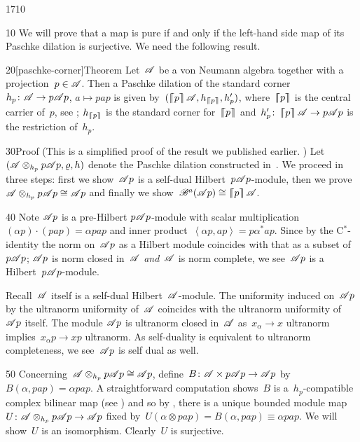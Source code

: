 \begin{parsec}{1710}%
\begin{point}{10}%
We will prove that a map is pure if and only if
    the left-hand side map of its Paschke dilation
    is surjective.  We need the following result.
\end{point}
\begin{point}{20}[paschke-corner]{Theorem}%
Let~$\mathscr{A}$ be a von Neumann algebra together with a projection~$p \in \mathscr{A}$.
Then a Paschke dilation of the standard corner~$h_p \colon \mathscr{A} \to p\mathscr{A} p$,
$a \mapsto pap$
is given by~$(\cceil{p}\scrA, h_{\cceil{p}}, h'_p)$,
    where~$\left\lceil\!\!\left\lceil p\right\rceil\!\!\right\rceil$ is the central  carrier of~$p$,
    see ;
    $h_{\left\lceil\!\!\left\lceil p\right\rceil\!\!\right\rceil}$ is the standard corner for~$\left\lceil\!\!\left\lceil p\right\rceil\!\!\right\rceil$
        and~$h'_p \colon \left\lceil\!\!\left\lceil p\right\rceil\!\!\right\rceil \mathscr{A} \to p\mathscr{A} p$
        is the restriction of~$h_p$.
\begin{point}{30}{Proof}%
(This is a simplified proof of the result we published earlier.
    \cite[thm.~28]{wwpaschke})
Let~$(\mathscr{A} \otimes_{h_p} p\mathscr{A} p, \varrho, h)$
    denote the Paschke dilation constructed in~.
We proceed in three steps:
    first we show~$\mathscr{A} p$ is a self-dual Hilbert~$p\mathscr{A} p$-module,
    then we prove~$\mathscr{A} \otimes_{h_p} p\mathscr{A} p \cong \mathscr{A} p$
    and finally we show~$\mathscr{B}^a(\mathscr{A} p) \cong \left\lceil\!\!\left\lceil p\right\rceil\!\!\right\rceil \mathscr{A}$.
\begin{point}{40}%
Note $\mathscr{A} p$ is a pre-Hilbert $p \mathscr{A} p$-module
    with scalar multiplication~$(\alpha p)\cdot (pap) = \alpha pap$
    and inner product~$\left<\alpha p, ap\right> = p\alpha^*ap$.
Since by the C$^*$-identity the norm on~$\mathscr{A} p$
    as a Hilbert module coincides with that as a subset of~$p \mathscr{A} p$;
    $\mathscr{A} p$ is norm closed in~$\mathscr{A}$ \emph{and}~$\mathscr{A}$ is norm complete,
    we see~$\mathscr{A} p$ is a Hilbert~$p \mathscr{A} p$-module.

Recall~$\mathscr{A}$ itself is a self-dual Hilbert~$\mathscr{A}$-module.
The uniformity induced on~$\mathscr{A} p$ by the ultranorm uniformity
    of~$\mathscr{A}$ coincides with the ultranorm uniformity of~$\mathscr{A} p$ itself.
The module $\mathscr{A} p$ is ultranorm closed in~$\mathscr{A}$
    as~$x_\alpha \to x$ ultranorm
    implies~$x_\alpha p \to xp$ ultranorm.
As self-duality is equivalent to ultranorm completeness,
    we see~$\mathscr{A} p$ is self dual as well.
\end{point}
\begin{point}{50}%
Concerning~$\mathscr{A} \otimes_{h_p} p \mathscr{A} p \cong \mathscr{A} p$,
    define~$B\colon \mathscr{A} \times  p \mathscr{A} p \to \mathscr{A} p$
    by~$B(\alpha, pap) = \alpha pap$.
A straightforward computation
    shows~$B$ is a~$h_p$-compatible complex bilinear map
    (see )
    and so by ,  there is a unique bounded module
    map~$U \colon \mathscr{A} \otimes_{h_p} p \mathscr{A} p \to \mathscr{A} p$
    fixed by~$U (\alpha \otimes pap) = B(\alpha,pap) \equiv \alpha pap $.
We will show~$U$ is an isomorphism.
   Clearly~$U$ is surjective.


\end{point}
\end{point}
\end{point}
\end{parsec}
